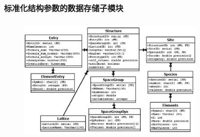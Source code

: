 \documentclass[cjk,slidestop,handout,compress,mathserif,blue]{beamer}	%
\begin{document}
\frame
{
	\frametitle{标准化结构参数的数据存储子模块}
\begin{figure}[h!]
\centering
\vspace*{-0.2in}
\includegraphics[height=2.5in,width=3.7in,viewport=0 0 850 540,clip]{Figures/MP_database_structure.png}
\caption{\fontsize{7.2pt}{4.2pt}}%
\label{MP_structure_data}
\end{figure} 
}
\end{document}
